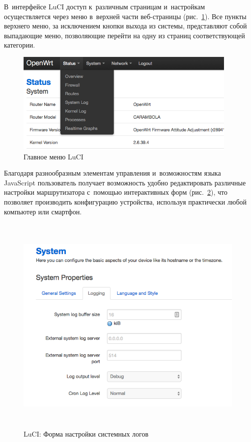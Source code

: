 В~интерфейсе LuCI доступ к~различным страницам и~настройкам осуществляется через меню в~верхней части веб-страницы (рис.~\ref{fig:openwrt-menu}). Все пункты верхнего меню, за исключением кнопки выхода из системы, представляют собой выпадающие меню, позволяющие перейти на одну из страниц соответствующей категории.

\begin{figure}[h!]
  \centering
  \includegraphics[height=5cm]{img/openwrt-menu}
  \vspace*{12pt}
  \caption{Главное меню LuCI}\label{fig:openwrt-menu}
\end{figure}

Благодаря разнообразным элементам управления и~возможностям языка JavaScript пользователь получает возможность удобно редактировать различные настройки маршрутизатора с~помощью интерактивных форм (рис.~\ref{fig:openwrt-logging-settings}), что позволяет производить конфигурацию устройства, используя практически любой компьютер или смартфон.

\begin{figure}[h!]
  \centering
  \includegraphics[height=11cm]{img/openwrt-logging-settings}
  \vspace*{12pt}
  \caption{LuCI: Форма настройки системных логов}\label{fig:openwrt-logging-settings}
\end{figure}

